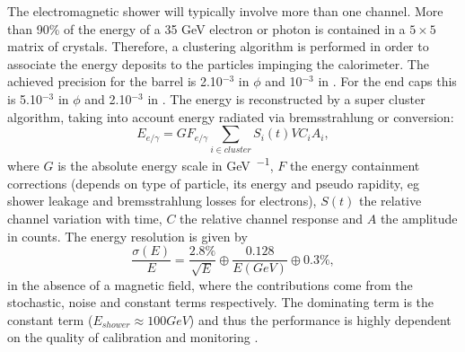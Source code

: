 The electromagnetic shower will typically involve more than one channel. More than 90\% of the energy of a 35 \si{ \GeV} electron or photon is contained in a $5\times 5$ matrix of crystals. Therefore, a clustering algorithm is performed in order to associate the energy deposits to the particles impinging the calorimeter.
The achieved precision\cite{1748-0221-12-01-C01069} for the barrel is 2.10$^{-3}$ \si{ \rad} in $\phi$ and 10$^{-3}$ in \psrap. For the end caps this is 5.10$^{-3}$ \si{ \rad} in $\phi$ and 2.10$^{-3}$ in \psrap. The energy is reconstructed by a super cluster algorithm, taking into account energy radiated via bremsstrahlung or conversion: 
\begin{equation}
E_{e/\gamma} = G F_{e/\gamma} \sum_{i \in cluster} S_i(t) VC_i A_i,
\end{equation}
where $G$ is the absolute energy scale in \si{ \GeV \per \ADC}, $F$ the energy containment corrections (depends on type of particle, its energy and pseudo rapidity, eg shower leakage and bremsstrahlung losses for electrons), $S(t)$ the relative channel variation with time, $C$ the relative channel response and $A$ the amplitude in \si{ \ADC} counts. The energy resolution is given by 
\begin{equation}
\frac{\sigma(E)}{E} = \frac{2.8\%}{\sqrt{E}}\oplus \frac{0.128}{E(GeV)} \oplus 0.3\%, 
\end{equation}
in the absence of a magnetic field, where the contributions come from the stochastic, noise and constant terms respectively. The dominating term is the constant term ($E_{shower} \approx 100 GeV$) and thus the performance is highly dependent on the quality of calibration and monitoring .

